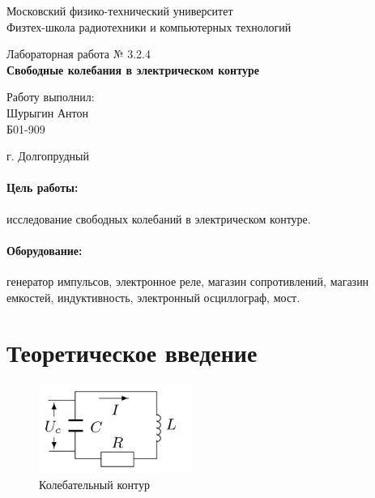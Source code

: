 \documentclass[a4paper, 14pt]{extarticle}
\date{}
\begin{document}
\begin{titlepage}
	\begin{center}
		\large 	Московский физико-технический университет \\
		Физтех-школа радиотехники и компьютерных технологий\\
		\vspace{0.2cm}
		
		\vspace{4.5cm}
		Лабораторная работа № 3.2.4 \\ \vspace{0.2cm}
		\LARGE \textbf{Свободные колебания в электрическом контуре}
	\end{center}
	\vspace{2.3cm} \large
	
	\begin{center}
		Работу выполнил: \\
		Шурыгин Антон \\
		Б01-909

	\end{center}
	
	\begin{center} \vspace{60mm}
		г. Долгопрудный \\
	\end{center}
\end{titlepage}




\paragraph*{Цель работы:} исследование свободных колебаний в электрическом контуре.

\paragraph*{Оборудование:} генератор импульсов, электронное реле, магазин сопротивлений, магазин емкостей, индуктивность, электронный осциллограф, мост.



\section{Теоретическое введение}

\begin{figure}[h]
	\includegraphics[width=5cm]{pics/RLC.png}
	\caption{Колебательный контур}
	\label{RLC}
\end{figure}
\end{document}
